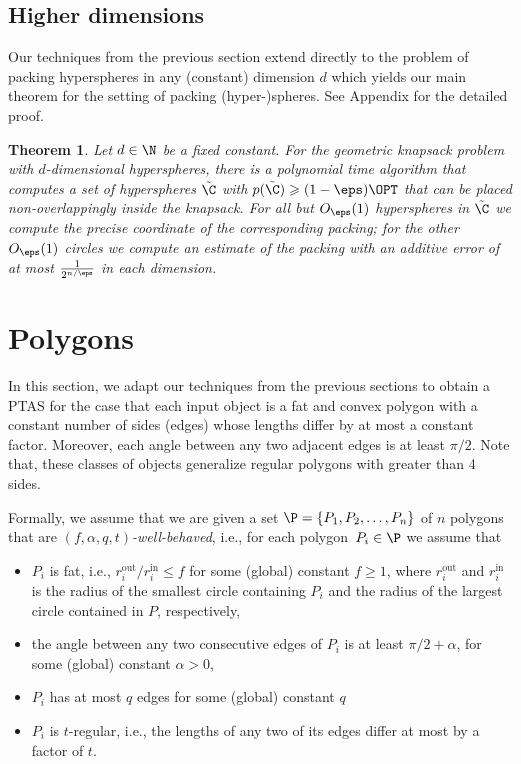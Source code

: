 \documentclass[10pt,a4paper]{article}
\newtheorem{theorem}{Theorem}[section]
\theoremstyle{plain}
\theoremstyle{plain}
\theoremstyle{plain}
\theoremstyle{definition}
\begin{document}
{\subsection{Higher dimensions}

Our techniques from the previous section extend directly to the problem of packing
hyperspheres in any (constant) dimension $d$ which yields our main theorem for the setting of packing
(hyper-)spheres. See Appendix for the detailed proof. 


\begin{theorem}\label{thm:d-dim-ptas} Let $d\in\N$ be a fixed constant. For the geometric knapsack problem with
	$d$-dimensional hyperspheres, there is a polynomial time algorithm
	that computes a set of hyperspheres $\tilde{\C}$ with $p(\tilde{\C})\geqslant(1-\eps)\OPT$
	that can be placed non-overlappingly inside the knapsack. For all
	but $O_{\eps}(1)$ hyperspheres in $\tilde{\C}$ we compute the
	precise coordinate of the corresponding packing; for the other $O_{\eps}(1)$
	circles we compute an estimate of the packing with an additive error
	of at most $\frac{1}{2^{n/\eps}}$ in each dimension. \end{theorem}



\section{Polygons}
\label{sec:polygon}

{
In this section, we adapt our techniques from the previous sections to obtain a \textsf{PTAS} for the case that each input object is a fat and convex
polygon with a constant number of sides (edges) whose lengths differ by at most a constant factor. Moreover,  
each angle between any two adjacent edges is at least $\pi/2$. Note that, these classes of objects generalize regular polygons with greater than 4 sides. 
}

{Formally, we assume that we are given a set
$\P = \{ P_1, P_2, \dots , P_n \}$ of $n$ polygons that are \emph{$(f,\alpha,q, t)$-well-behaved}, i.e., for each
polygon~$P_{i}\in\P$ we assume that}
\begin{itemize}
	\item $P_i$ is fat, i.e., $r_{i}^{\mathrm{out}}/r_{i}^{\mathrm{in}}\le f$
	for some (global) constant $f \ge 1$, where
	$r_{i}^{\mathrm{out}}$ and $r_{i}^{\mathrm{in}}$ is
	the radius of the smallest circle containing $P_{i}$ and the radius
	of the largest circle contained in $P$, respectively,
	\item the angle between any two consecutive edges of $P_i$ is at least $\pi/2+\alpha$,
	for some (global) constant $\alpha>0$,
	\item $P_i$ has at most $q$ {edges} for some (global) constant $q$
 \item $P_i$ is $t$-regular, i.e., the lengths of any two of its edges
	differ at most by a factor of $t$.
\end{itemize}

}
\end{document}

